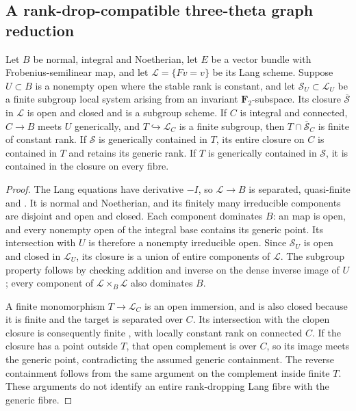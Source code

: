 \subsection{A rank-drop-compatible three-theta graph reduction}

\begin{lemma}
\label{lem:normal-base-clopen-Lang-closure-candidate}
Let $B$ be normal, integral and Noetherian, let $E$ be a vector bundle
with Frobenius-semilinear map, and let $\mathcal L=\{Fv=v\}$ be its
Lang scheme. Suppose $U\subset B$ is a nonempty open where the stable
rank is constant, and let $\mathcal S_U\subset\mathcal L_U$ be a
finite \etale subgroup local system arising from an invariant
$\mathbf F_2$-subspace. Its closure $\overline{\mathcal S}$ in
$\mathcal L$ is open and closed and is a subgroup scheme.
If $C$ is integral and connected, $C\to B$ meets $U$ generically,
and $T\hookrightarrow\mathcal L_C$ is a finite \etale subgroup,
then $T\cap\overline{\mathcal S}_C$ is finite \etale of constant
rank. If $\mathcal S$ is generically contained in $T$, its entire
closure on $C$ is contained in $T$ and retains its generic rank.
If $T$ is generically contained in $\mathcal S$, it is contained
in the closure on every fibre.
\end{lemma}
\begin{proof}
The Lang equations have derivative $-I$, so $\mathcal L\to B$ is
separated, quasi-finite and \etale. It is normal and Noetherian,
and its finitely many irreducible components are disjoint and open
and closed. Each component dominates $B$: an \etale map is open,
and every nonempty open of the integral base contains its generic
point. Its intersection with $U$ is therefore a nonempty irreducible
open. Since $\mathcal S_U$ is open and closed in $\mathcal L_U$,
its closure is a union of entire components of $\mathcal L$.
The subgroup property follows by checking addition and inverse on
the dense inverse image of $U$; every component of
$\mathcal L\times_B\mathcal L$ also dominates $B$.

A finite \etale monomorphism $T\to\mathcal L_C$ is an open immersion,
and is also closed because it is finite and the target is separated
over $C$. Its intersection with the clopen closure is consequently
finite \etale, with locally constant rank on connected $C$.
If the closure has a point outside $T$, that open complement is
\etale over $C$, so its image meets the generic point, contradicting
the assumed generic containment. The reverse containment follows
from the same argument on the complement inside finite \etale $T$.
These arguments do not identify an entire rank-dropping Lang fibre
with the generic fibre.
\end{proof}

